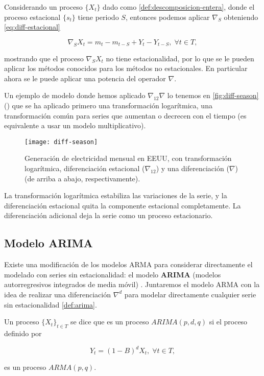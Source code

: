 Considerando un proceso $\{X_t\}$ dado como \autoref{def:descomposicion-entera}, donde el proceso estacional $\{s_t\}$ tiene periodo $S$, entonces podemos aplicar $\nabla_S$ obteniendo \eqref{eq:diff-estacional}

\begin{equation}
  \nabla_S X_t = m_t - m_{t - S} + Y_t - Y_{t - S}, \; \forall t \in T,
\label{eq:diff-estacional}
\end{equation}

mostrando que el proceso $\nabla_S X_t$ no tiene estacionalidad, por lo que se le pueden aplicar los métodos conocidos para los métodos no estacionales. En particular ahora se le puede aplicar una potencia del operador $\nabla$.

Un ejemplo de modelo donde hemos aplicado $\nabla_12 \nabla$ lo tenemos en \autoref{fig:diff-season} (\cite{hyndman2018forecasting}) que se ha aplicado primero una transformación logarítmica, una transformación común para series que aumentan o decrecen con el tiempo (es equivalente a usar un modelo multiplicativo).

\begin{figure}[htpb]
  \centering
  \texttt{[image: diff-season]}
  \caption{Generación de electricidad mensual en EEUU, con transformación logarítmica, diferenciación estacional ($\nabla_{12}$) y una diferenciación ($\nabla$) (de arriba a abajo, respectivamente).}
  \label{fig:diff-season}
\end{figure}

La transformación logarítmica estabiliza las variaciones de la serie, y la diferenciación estacional quita la componente estacional completamente. La diferenciación adicional deja la serie como un proceso estacionario.

\subsection{Modelo ARIMA}

Existe una modificación de los modelos ARMA para considerar directamente el modelado con series sin estacionalidad: el modelo \textbf{ARIMA} (modelos autorregresivos integrados de media móvil) \cite{box2011time}. Juntaremos el modelo ARMA con la idea de realizar una diferenciación $\nabla^d$ para modelar directamente cualquier serie sin estacionalidad \autoref{def:arima}.

\begin{definicion}
  Un proceso $\{X_t\}_{t \in T}$ se dice que es un proceso $ARIMA(p, d, q)$ si el proceso definido por

  $$ Y_t = (1 - B)^d X_t, \; \forall t \in T,$$

  es un proceso $ARMA(p, q)$.
\label{def:arima}
\end{definicion}

